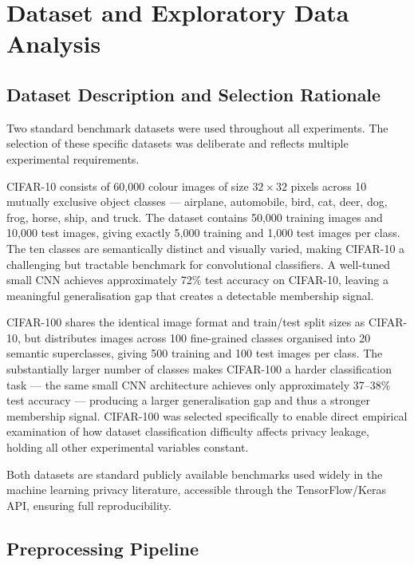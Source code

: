 \documentclass[12pt, a4paper]{report}
\begin{document}
\chapter{Dataset and Exploratory Data Analysis}

\section{Dataset Description and Selection Rationale}

Two standard benchmark datasets were used throughout all experiments. The
selection of these specific datasets was deliberate and reflects multiple
experimental requirements.

CIFAR-10 consists of 60,000 colour images of size $32 \times 32$ pixels across
10 mutually exclusive object classes --- airplane, automobile, bird, cat, deer,
dog, frog, horse, ship, and truck. The dataset contains 50,000 training images
and 10,000 test images, giving exactly 5,000 training and 1,000 test images per
class. The ten classes are semantically distinct and visually varied, making
CIFAR-10 a challenging but tractable benchmark for convolutional classifiers.
A well-tuned small CNN achieves approximately 72\% test accuracy on CIFAR-10,
leaving a meaningful generalisation gap that creates a detectable membership
signal.

CIFAR-100 shares the identical image format and train/test split sizes as
CIFAR-10, but distributes images across 100 fine-grained classes organised into
20 semantic superclasses, giving 500 training and 100 test images per class.
The substantially larger number of classes makes CIFAR-100 a harder classification
task --- the same small CNN architecture achieves only approximately 37--38\% test
accuracy --- producing a larger generalisation gap and thus a stronger membership
signal. CIFAR-100 was selected specifically to enable direct empirical examination
of how dataset classification difficulty affects privacy leakage, holding all
other experimental variables constant.

Both datasets are standard publicly available benchmarks used widely in the machine learning
privacy literature, accessible through the TensorFlow/Keras API, ensuring full reproducibility.

\section{Preprocessing Pipeline}
\end{document}
